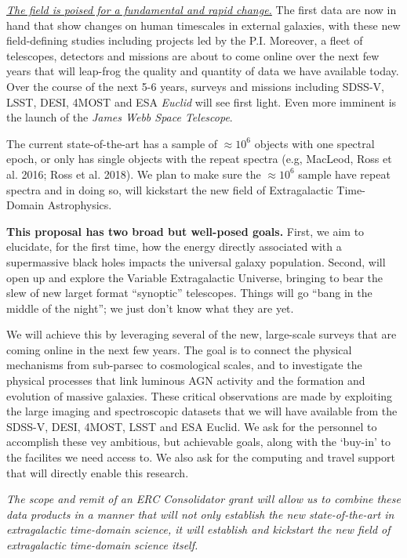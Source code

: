 \documentclass[oneside, a4paper, onecolumn, 11pt]{article}
\begin{document}
\smallskip
\smallskip
\noindent
\underline{{\it The field is poised for a fundamental and rapid
change.}} The first data are now in hand that show changes on human
timescales in external galaxies, with these new field-defining studies
including projects led by the P.I.  Moreover, a fleet of telescopes,
detectors and missions are about to come online over the next few
years that will leap-frog the quality and quantity of data we have
available today. Over the course of the next 5-6 years, surveys and
missions including SDSS-V, LSST, DESI, 4MOST and ESA {\it Euclid} will
see first light. Even more imminent is the launch of the {\it James
Webb Space Telescope}.

\smallskip
\smallskip
\noindent
The current state-of-the-art has a sample of $\approx10^{6}$ objects
with one spectral epoch, or only has single objects with the repeat
spectra (e.g, MacLeod, Ross et al. 2016; Ross et al. 2018).  
We plan to make sure the $\approx10^{6}$ sample have
repeat spectra and in doing so, will kickstart the new field of
Extragalactic Time-Domain Astrophysics.


\smallskip
\smallskip
\noindent
{\bf This proposal has two broad but well-posed goals.}
First, we aim to elucidate, for the first time, how the energy
directly associated with a supermassive black holes impacts the
universal galaxy population.
Second, will open up and explore the Variable Extragalactic Universe,
bringing to bear the slew of new larget format ``synoptic''
telescopes. Things will go ``bang in the middle of the night''; we
just don't know what they are yet. 
%

\smallskip
\smallskip
\noindent
We will achieve this by leveraging several of the new, large-scale
surveys that are coming online in the next few years.
The goal is to connect the physical mechanisms from sub-parsec to
cosmological scales, and to investigate the physical processes that
link luminous AGN activity and the formation and evolution of massive
galaxies. These critical observations are made by exploiting the large
imaging and spectroscopic datasets that we will have available from
the SDSS-V, DESI, 4MOST, LSST and ESA Euclid.
We ask for the personnel to accomplish these vey ambitious, but
achievable goals, along with the `buy-in' to the facilites we need
access to.  We also ask for the computing and travel support that will
directly enable this research.

\smallskip
\smallskip
\noindent
{\it The scope and
remit of an ERC Consolidator grant will allow us to combine these data
products in a manner that will not only establish the new
state-of-the-art in extragalactic time-domain science, it will
establish and kickstart the new field of extragalactic time-domain 
science itself.}
\end{document}
